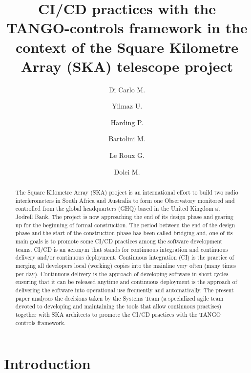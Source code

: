 \documentclass[a4paper]{spie}  %
\title{CI/CD practices with the TANGO-controls framework in the context of the Square Kilometre Array (SKA) telescope project}
\author[a]{Di Carlo M.}
\author[b]{Yilmaz U.}
\author[b]{Harding P.}
\author[b]{Bartolini M.}
\author[c]{Le Roux G.}
\author[a]{Dolci M.}
\affil[a]{INAF Osservatorio Astronomico d'Abruzzo, Teramo, Italy}
\affil[b]{SKA Organisation, Macclesfield, UK}
\affil[c]{SKA South Africa, SA}
\begin{document}
\maketitle

\begin{abstract}
The Square Kilometre Array (SKA) project is an international effort to build two radio interferometers in South Africa and Australia to form one Observatory monitored and controlled from the global headquarters (GHQ) based in the United Kingdom at Jodrell Bank. The project is now approaching the end of its design phase and gearing up for the beginning of formal construction. The period between the end of the design phase and the start of the construction phase has been called bridging and, one of its main goals is to promote some CI/CD practices among the software development teams. CI/CD is an acronym that stands for continuous integration and continuous delivery and/or continuous deployment. Continuous integration (CI) is the practice of merging all developers local (working) copies into the mainline very often (many times per day). Continuous delivery is the approach of developing software in short cycles ensuring that it can be released anytime and continuous deployment is the approach of delivering the software into operational use frequently and automatically. The present paper analyses the decisions taken by the Systems Team (a specialized agile team devoted to developing and maintaining the tools that allow continuous practises) together with SKA architects to promote the CI/CD practices with the TANGO controls framework.
\end{abstract}


\section{Introduction}
\label{sec:intro}  %
\end{document}
